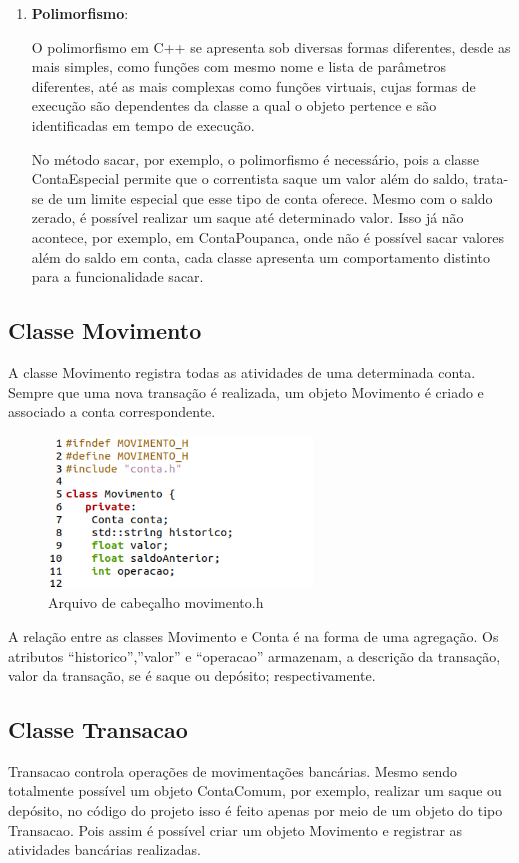 \documentclass[conference]{IEEEtran}
\begin{document}
\begin{enumerate}
    \item \textbf{Polimorfismo}:

    O polimorfismo em C++ se apresenta sob diversas formas diferentes, desde as mais simples, como funções com mesmo nome e lista de parâmetros diferentes, até as mais complexas como funções virtuais, cujas formas de execução são dependentes da classe a qual o objeto pertence e são identificadas em tempo de execução.
    
    No método sacar, por exemplo, o polimorfismo é necessário, pois a classe ContaEspecial permite que o correntista saque um valor além do saldo, trata-se de um limite especial que esse tipo de conta oferece. Mesmo com o saldo zerado, é possível realizar um saque até determinado valor. Isso já não acontece, por exemplo, em ContaPoupanca, onde não é possível sacar valores além do saldo em conta, cada classe apresenta um comportamento distinto para a funcionalidade sacar.
    \end{enumerate}

    \subsection{Classe Movimento}
    A classe Movimento registra todas as atividades de uma determinada conta. Sempre que uma nova transação é realizada, um objeto Movimento é criado e associado a conta correspondente. 
    \begin{figure}[htbp]
        \centering
        \includegraphics[width=7cm]{../img/Movimento.png}
        \caption{Arquivo de cabeçalho movimento.h}
        \label{fig_conta}
    \end{figure}

    A relação entre as classes Movimento e Conta é na forma de uma agregação. Os atributos “historico”,”valor” e “operacao” armazenam, a descrição da transação, valor da transação, se é saque ou depósito; respectivamente.

    \subsection{Classe Transacao}
    Transacao controla operações de movimentações bancárias. Mesmo sendo totalmente possível um objeto ContaComum, por exemplo, realizar um saque ou depósito, no código do projeto isso é feito apenas por meio de um objeto do tipo Transacao. Pois assim é possível criar um objeto Movimento e registrar as atividades bancárias realizadas.
\end{document}
